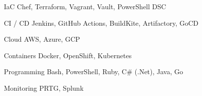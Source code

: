 \textcolor{awesome}{\raisebox{0.2\height}{\faCode\thinspace}}

\begin{cvskills}

  \cvskill
    {IaC} %
    {Chef, Terraform, Vagrant, Vault, PowerShell DSC} %

  \cvskill
    {CI / CD} %
    {Jenkins, GitHub Actions, BuildKite, Artifactory, GoCD} %

  \cvskill
    {Cloud} %
    {AWS, Azure, GCP} %

  \cvskill
    {Containers} %
    {Docker, OpenShift, Kubernetes} %

  \cvskill
    {Programming} %
    {Bash, PowerShell, Ruby, C\# (.Net), Java, Go} %

  \cvskill
    {Monitoring} %
    {PRTG, Splunk} %

\end{cvskills}

